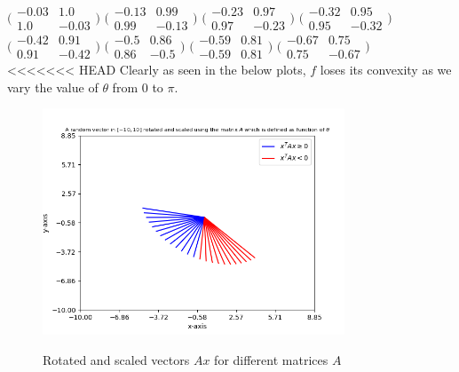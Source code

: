 \documentclass{article}
\begin{document}
\begin{flushleft}
$\Big(\begin{matrix}-0.03 & 1.0 \\ 1.0 & -0.03\end{matrix}\Big)$
$\Big(\begin{matrix}-0.13 & 0.99 \\ 0.99 & -0.13\end{matrix}\Big)$
$\Big(\begin{matrix}-0.23 & 0.97 \\ 0.97 & -0.23\end{matrix}\Big)$
$\Big(\begin{matrix}-0.32 & 0.95 \\ 0.95 & -0.32\end{matrix}\Big)$
$\Big(\begin{matrix}-0.42 & 0.91 \\ 0.91 & -0.42\end{matrix}\Big)$
$\Big(\begin{matrix}-0.5 & 0.86 \\ 0.86 & -0.5\end{matrix}\Big)$
$\Big(\begin{matrix}-0.59 & 0.81 \\ -0.59 & 0.81\end{matrix}\Big)$
$\Big(\begin{matrix}-0.67 & 0.75 \\ 0.75 & -0.67\end{matrix}\Big)$\\
<<<<<<< HEAD
Clearly as seen in the below plots, $f$ loses its convexity as we vary the value of $\theta$ from $0$ to $\pi$.\\
\begin{figure}[htp]
        \centering
        \includegraphics[width=9cm]{psd.png}\\
        \caption{Rotated and scaled vectors $Ax$ for different matrices $A$}

\end{figure}
\end{flushleft}
\end{document}
